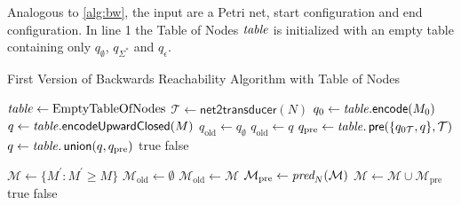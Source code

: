 Analogous to \autoref{alg:bw}, the input are a Petri net, start configuration and end configuration. In line 1 the Table of Nodes $\mathit{table}$ is initialized with an empty table containing only $q_{\emptyset}$, $q_{\Sigma^{*}}$ and $q_{\epsilon}$. 


\newenvironment{algocolor}{%
   \color{gray}
}{}

\begin{algorithm}[htb]
\caption{First Version of Backwards Reachability Algorithm with Table of Nodes}\label{alg:bw_wwa}
\begin{minipage}[t]{0.6\textwidth}
\begin{algorithmic}[1]
\State $\mathit{table} \gets \text{EmptyTableOfNodes}$
\State $\mathcal{T} \gets \textsf{net2transducer}(N)$
\State $q_{0} \gets  \mathit{table}.\textsf{encode}(M_{0})$
\State $q \gets \mathit{table}.\textsf{encodeUpwardClosed}(M)$
\State $q_{\text{old}} \gets q_{\emptyset}$
	\State $q_{\text{old}}  \gets q$
	\State $q_{\text{pre}} \gets \mathit{table}.\operatorname{\textsf{pre}}(\{q_{0\mathcal{T}},q\},\mathcal{T})$
	\State $q \gets \mathit{table}.\operatorname{\textsf{union}}(q, q_{\text{pre}})$
	\Return true
\EndIf
{}
    \Return false
\EndIf
\EndWhile
\end{algorithmic}
\end{minipage}
\begin{algocolor}
\begin{minipage}[t]{0.37\textwidth}
\begin{algorithmic}
\State 
\State 
\State 
\State $\mathcal{M} \gets \{ M^{'} : M^{'} \ge M \}$
\State $\mathcal{M}_{\text{old}} \gets \emptyset$
	\State $\mathcal{M}_{\text{old}} \gets \mathcal{M}$
	\State $\mathcal{M}_{\text{pre}} \gets \operatorname{\textit{pred}}_{N}(\mathcal{M})$
	\State $\mathcal{M} \gets \mathcal{M}  \cup \mathcal{M}_{\text{pre}}$
	\Return true
\EndIf
{}
    \Return false
\EndIf
\EndWhile
\end{algorithmic}
\end{minipage}
\end{algocolor}
\end{algorithm}


